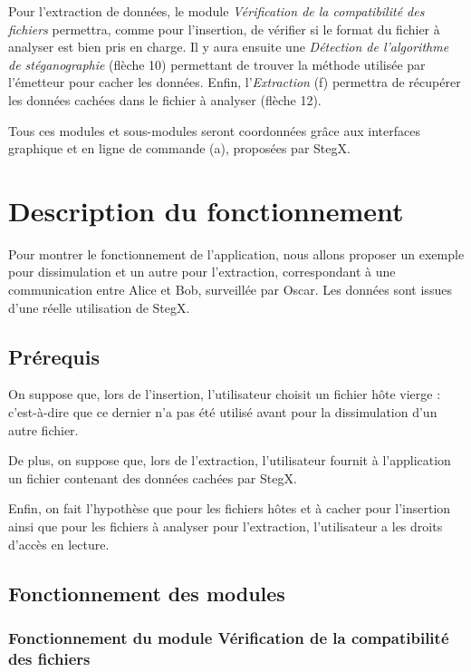 \documentclass[11pt]{article}
\begin{document}
Pour l'extraction de données, le module \textit{Vérification de la compatibilité 
des fichiers} permettra, comme pour l'insertion, de vérifier si le format 
du fichier à analyser est bien pris en charge. 
Il y aura ensuite une \textit{Détection de l'algorithme de stéganographie} 
(flèche 10) permettant de trouver la méthode utilisée par l'émetteur pour 
cacher les données. 
Enfin, l'\textit{Extraction} (f) permettra de récupérer les données cachées 
dans le fichier à analyser (flèche 12). 

Tous ces modules et sous-modules seront coordonnées grâce aux interfaces 
graphique et en ligne de commande (a), proposées par StegX. 


\section{Description du fonctionnement}

Pour montrer le fonctionnement de l'application, nous allons proposer un 
exemple pour dissimulation et un autre pour l'extraction, correspondant 
à une communication entre Alice et Bob, surveillée par Oscar. 
Les données sont issues d'une réelle utilisation de StegX. 

\subsection{Prérequis}

On suppose que, lors de l'insertion, l'utilisateur choisit un fichier hôte
vierge : c'est-à-dire que ce dernier n'a pas été utilisé avant pour la 
dissimulation d'un autre fichier. 

De plus, on suppose que, lors de l'extraction, l'utilisateur fournit à 
l'application un fichier contenant des données cachées par StegX. 

Enfin, on fait l'hypothèse que pour les fichiers hôtes et à cacher pour l'insertion 
ainsi que pour les fichiers à analyser pour l'extraction, l'utilisateur a 
les droits d'accès en lecture. 

\subsection{Fonctionnement des modules}

\subsubsection{Fonctionnement du module Vérification de la compatibilité des 
fichiers}
\end{document}

